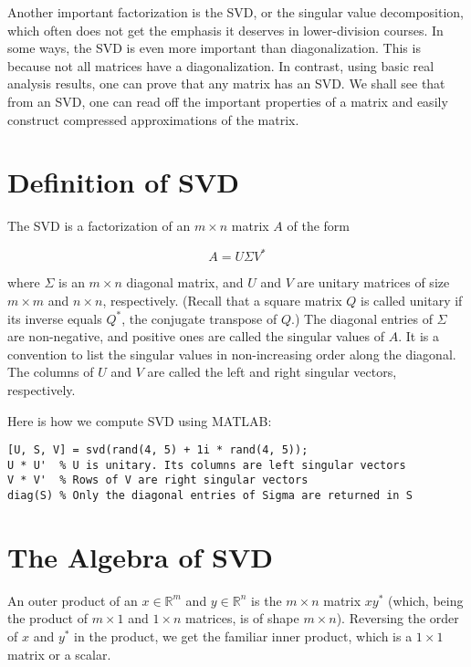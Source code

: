 \documentclass{ximera}
\begin{document}
Another important factorization is the SVD, or the singular value decomposition, which often does not get the emphasis it deserves in lower-division courses. In some ways, the SVD is even more important than diagonalization. This is because not all matrices have a diagonalization. In contrast, using basic real analysis results, one can prove that any matrix has an SVD. We shall see that from an SVD, one can read off the important properties of a matrix and easily construct compressed approximations of the matrix.

\section{Definition of SVD}

The SVD is a factorization of an \( m \times n \) matrix \( A \) of the form

\[
A = U \Sigma V^*
\]

where \( \Sigma \) is an \( m \times n \) diagonal matrix, and \( U \) and \( V \) are unitary matrices of size \( m \times m \) and \( n \times n \), respectively. (Recall that a square matrix \( Q \) is called unitary if its inverse equals \( Q^* \), the conjugate transpose of \( Q \).) The diagonal entries of \( \Sigma \) are non-negative, and positive ones are called the singular values of \( A \). It is a convention to list the singular values in non-increasing order along the diagonal. The columns of \( U \) and \( V \) are called the left and right singular vectors, respectively.

Here is how we compute SVD using MATLAB:

\begin{verbatim}
[U, S, V] = svd(rand(4, 5) + 1i * rand(4, 5));
U * U'  % U is unitary. Its columns are left singular vectors
V * V'  % Rows of V are right singular vectors
diag(S) % Only the diagonal entries of Sigma are returned in S
\end{verbatim}

\section{The Algebra of SVD}

An outer product of an \( x \in \mathbb{R}^m \) and \( y \in \mathbb{R}^n \) is the \( m \times n \) matrix \( x y^* \) (which, being the product of \( m \times 1 \) and \( 1 \times n \) matrices, is of shape \( m \times n \)). Reversing the order of \( x \) and \( y^* \) in the product, we get the familiar inner product, which is a \( 1 \times 1 \) matrix or a scalar.
\end{document}
